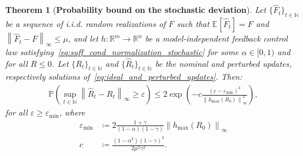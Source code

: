 \documentclass[10pt,leqno]{amsart}
\newcommand{\sml}{\scriptscriptstyle}
\newcommand{\norm}[1]{\left \|#1 \right \|}
\newcommand{\R}{\mathbb{R}}
\newcommand{\N}{\mathbb{N}}
\newcommand{\Cost}{R}
\newcommand{\F}{F}
\newcommand{\Fapx}{\hat{F}}
\newcommand{\disc}{\gamma}
\newcommand{\infnorm}[1]{\norm{#1}_\infty}
\newcommand{\outmap}{h_{\sml \text{max}}}
\newcommand{\threshold}{\varepsilon_{\sml \text{min}}}
\newcommand{\prob}{\mathbb{P}}
\newcommand{\E}[2]{\mathbb{E}_{#1}\left[#2\right]}
\newcommand{\Costpert}{\hat{\Cost}}
\newtheorem{theorem}{Theorem}[]
\begin{document}
\begin{theorem}[\textbf{Probability bound on the stochastic deviation}]\label{th:probability_bound_deviation}
    Let $\{\Fapx_t\}_{t \in \N}$ be a sequence of i.i.d. random realizations of $\F$ such that $\E{}{\Fapx_t} = \F$ and $\infnorm{\Fapx_t - \F} \leq \mu$, and let $h : \R^m \to \R^n$ be a model-independent feedback control law satisfying~\eqref{eq:suff_cond_normalization_stochastic} for some $\alpha \in [0, 1)$ and for all $\Cost \leq 0$. Let $\{\Cost_t\}_{t \in \N}$ and $\{\Costpert_t\}_{t \in \N}$ be the nominal and perturbed updates, respectively solutions of~\eqref{eq:ideal_and_perturbed_updates}. Then:
    \begin{align}
        \prob\left(\sup_{t \in \N} \infnorm{\Costpert_t - \Cost_t} \geq \varepsilon\right) \leq 2 \exp\left(-c \frac{(\varepsilon - \threshold)^2}{\infnorm{\outmap(\Cost_0)}^2}\right),
    \end{align}
    for all $\varepsilon \geq \threshold$, where
    \begin{subequations}
        \begin{align}
        \threshold &\coloneqq 2\frac{1 + \disc}{(1 - \alpha)(1 - \disc)} \infnorm{\outmap(\Cost_0)}\label{eq:base_threshold}\\
        c &\coloneqq \frac{(1 - \alpha^2)(1 - \disc)^2}{2\mu^2\disc^2}.
    \end{align}
    \end{subequations}
\end{theorem}
\end{document}

